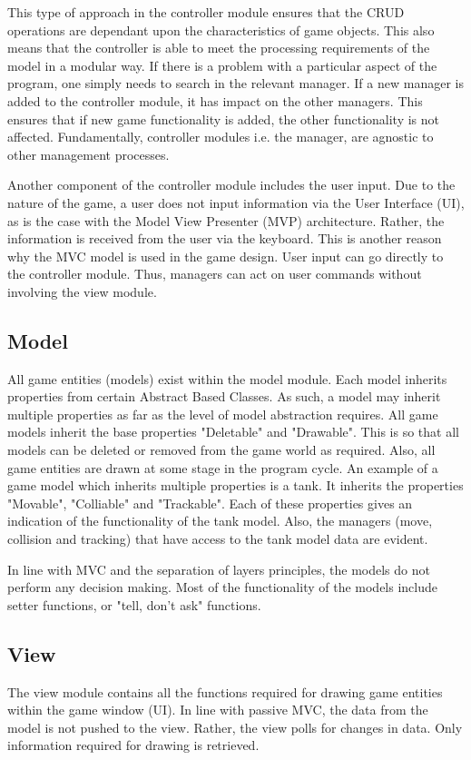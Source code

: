 \documentclass[10pt,twocolumn]{witseiepaper}
\begin{document}
This type of approach in the controller module ensures that the CRUD operations are dependant upon the characteristics of game objects. This also means that the controller is able to meet the processing requirements of the model in a modular way. If there is a problem with a particular aspect of the program, one simply needs to search in the relevant manager. If a new manager is added to the controller module, it has impact on the other managers. This ensures that if new game functionality is added, the other functionality is not affected. Fundamentally, controller modules i.e. the manager, are agnostic to other management processes.

Another component of the controller module includes the user input. Due to the nature of the game, a user does not input information via the User Interface (UI), as is the case with the Model View Presenter (MVP) architecture. Rather, the information is received from the user via the keyboard. This is another reason why the MVC model is used in the game design. User input can go directly to the controller module. Thus, managers can act on user commands without involving the view module.

\subsection{Model}
All game entities (models) exist within the model module. Each model inherits properties from certain Abstract Based Classes. As such, a model may inherit multiple properties as far as the level of model abstraction requires. All game models inherit the base properties "Deletable" and "Drawable". This is so that all models can be deleted or removed from the game world as required. Also, all game entities are drawn at some stage in the program cycle. An example of a game model which inherits multiple properties is a tank. It inherits the properties "Movable", "Colliable" and "Trackable". Each of these properties gives an indication of the functionality of the tank model. Also, the managers (move, collision and tracking) that have access to the tank model data are evident.

In line with MVC and the separation of layers principles, the models do not perform any decision making. Most of the functionality of the models include setter functions, or "tell, don't ask" functions.

\subsection{View}
The view module contains all the functions required for drawing game entities within the game window (UI). In line with passive MVC, the data from the model is not pushed to the view. Rather, the view polls for changes in data. Only information required for drawing is retrieved. 
\end{document}
